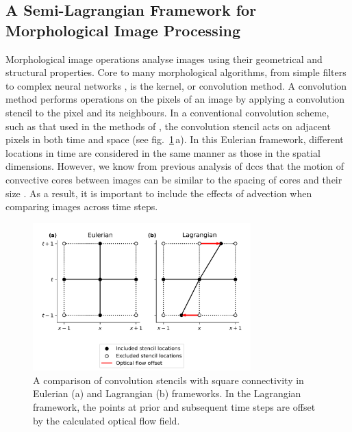\subsection{A Semi-Lagrangian Framework for Morphological Image Processing}

Morphological image operations analyse images using their geometrical and structural properties.
Core to many morphological algorithms, from simple filters to complex neural networks \citep{kalchbrenner_convolutional_2014}, is the kernel, or convolution method.
A convolution method performs operations on the pixels of an image by applying a convolution stencil to the pixel and its neighbours.
In a conventional convolution scheme, such as that used in the methods of \citet{fiolleau_algorithm_2013}, the convolution stencil acts on adjacent pixels in both time and space (see fig.~\ref{fig:convolution_kernels}\,a).
In this Eulerian framework, different locations in time are considered in the same manner as those in the spatial dimensions.
However, we know from previous analysis of \acrshort{dcc}s that the motion of convective cores between images can be similar to the spacing of cores and their size \citep{heikenfeld_tobac_2019}.
As a result, it is important to include the effects of advection when comparing images across time steps.


\begin{figure}[tp]
    \includegraphics[width=0.75\textwidth]{figures/chapter1_15.png}
    \caption[
    A comparison of convolution stencils with square connectivity in Eulerian and Lagrangian frameworks.
    ]{
    A comparison of convolution stencils with square connectivity in Eulerian (a) and Lagrangian (b) frameworks. In the Lagrangian framework, the points at prior and subsequent time steps are offset by the calculated optical flow field.
    }
    \label{fig:convolution_kernels}
\end{figure}


